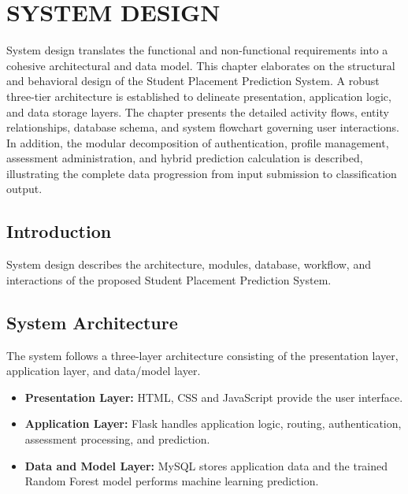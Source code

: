 \documentclass[12pt,a4paper]{report}
\begin{document}

\chapter{SYSTEM DESIGN}

System design translates the functional and non-functional requirements into a
cohesive architectural and data model. This chapter elaborates on the structural
and behavioral design of the Student Placement Prediction System. A robust
three-tier architecture is established to delineate presentation, application
logic, and data storage layers. The chapter presents the detailed activity
flows, entity relationships, database schema, and system flowchart governing
user interactions. In addition, the modular decomposition of authentication,
profile management, assessment administration, and hybrid prediction calculation
is described, illustrating the complete data progression from input submission
to classification output.

\section{Introduction}

System design describes the architecture, modules, database,
workflow, and interactions of the proposed Student Placement
Prediction System.

\section{System Architecture}

The system follows a three-layer architecture consisting of the
presentation layer, application layer, and data/model layer.

\begin{itemize}
    \item \textbf{Presentation Layer:} HTML, CSS and JavaScript
    provide the user interface.

    \item \textbf{Application Layer:} Flask handles application
    logic, routing, authentication, assessment processing, and
    prediction.

    \item \textbf{Data and Model Layer:} MySQL stores application
    data and the trained Random Forest model performs machine
    learning prediction.
\end{itemize}
\end{document}
